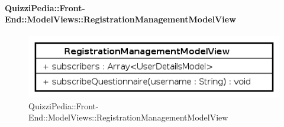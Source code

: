 \paragraph[QuizziPedia::Front-End::ModelViews\\::RegistrationManagementModelView]{QuizziPedia::Front-End::ModelViews::RegistrationManagementModelView}
	
	\label{QuizziPedia::Front-End::ModelViews::RegistrationManagementModelView}
	
	\begin{figure}[ht]
		\centering
		\includegraphics[scale=0.5,keepaspectratio]{UML/Classi/Front-End/QuizziPedia_Front-end_ModelView_RegistrationManagementModelView.png}
		\caption{QuizziPedia::Front-End::ModelViews::RegistrationManagementModelView}
	\end{figure} \FloatBarrier
	
